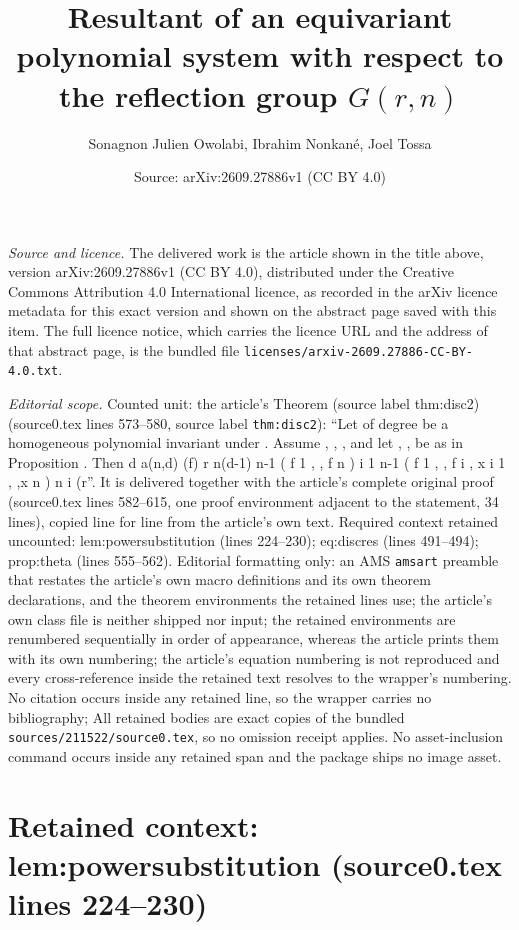 \documentclass[10pt,a4paper]{amsart}
\title[Resultant of an equivariant polynomial system with respect to the reflection group $G(r,n)$]{Resultant of an equivariant polynomial system with respect to the reflection group $G(r,n)$}
\author{Sonagnon Julien Owolabi, Ibrahim Nonkan\'{e}, Joel Tossa}
\date{Source: arXiv:2609.27886v1 (CC BY 4.0)}
\theoremstyle{plain}
\theoremstyle{definition}
\begin{document}
\maketitle

\noindent\emph{Source and licence.} The delivered work is the article shown in the title above, version arXiv:2609.27886v1 (CC BY 4.0), distributed under the Creative Commons Attribution 4.0 International licence, as recorded in the arXiv licence metadata for this exact version and shown on the abstract page saved with this item. The full licence notice, which carries the licence URL and the address of that abstract page, is the bundled file \texttt{licenses/arxiv-2609.27886-CC-BY-4.0.txt}.
\par\smallskip

\noindent\textit{Editorial scope.} Counted unit: the article's Theorem (source label thm:disc2) (source0.tex lines 573--580, source label \texttt{thm:disc2}): ``Let of degree be a homogeneous polynomial invariant under . Assume , , , and let , , be as in Proposition . Then d a(n,d) (f) r n(d-1) n-1 ( f 1 , , f n ) i 1 n-1 ( f 1 , , f i , x i 1 , ,x n ) n i (r''. It is delivered together with the article's complete original proof (source0.tex lines 582--615, one proof environment adjacent to the statement, 34 lines), copied line for line from the article's own text. Required context retained uncounted: lem:powersubstitution (lines 224--230); eq:discres (lines 491--494); prop:theta (lines 555--562). Editorial formatting only: an AMS \texttt{amsart} preamble that restates the article's own macro definitions and its own theorem declarations, and the theorem environments the retained lines use; the article's own class file is neither shipped nor input; the retained environments are renumbered sequentially in order of appearance, whereas the article prints them with its own numbering; the article's equation numbering is not reproduced and every cross-reference inside the retained text resolves to the wrapper's numbering. No citation occurs inside any retained line, so the wrapper carries no bibliography; All retained bodies are exact copies of the bundled \texttt{sources/211522/source0.tex}, so no omission receipt applies. No asset-inclusion command occurs inside any retained span and the package ships no image asset.


\section*{Retained context: lem:powersubstitution (source0.tex lines 224--230)}
\end{document}
